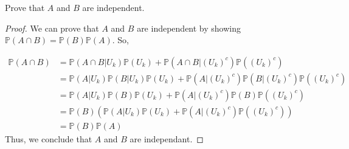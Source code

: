 \documentclass[12pt]{article}
\renewcommand{\P}{\mathbb{P}}
\newcommand{\p}[1]{\P\left(#1\right)}
\begin{document}
\begin{enumerate}
Prove that $A$ and $B$ are independent.

\begin{proof}
We can prove that $A$ and $B$ are independent by showing $\p{A \cap B} = \p{B}\p{A}$. So,

\begin{align*}
\p{A \cap B} &= \p{A \cap B | U_k}\p{U_k} + \p{A \cap B | (U_k)^c}\p{(U_k)^c} \\
&= \p{A | U_k}\p{B|U_k}\p{U_k} + \p{A | (U_k)^c}\p{B|(U_k)^c}\p{(U_k)^c} \\
&= \p{A | U_k}\p{B}\p{U_k} + \p{A | (U_k)^c}\p{B}\p{(U_k)^c} \\
&= \p{B}(\p{A | U_k}\p{U_k} + \p{A | (U_k)^c}\p{(U_k)^c}) \\
&= \p{B}\p{A}
\end{align*}
Thus, we conclude that $A$ and $B$ are independant. 
\end{proof}
\end{enumerate}
\end{document}
